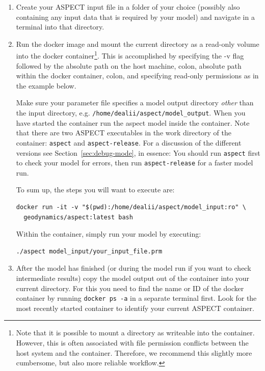 \documentclass{article}
\newcommand{\aspect}{\textsc{ASPECT}}
\begin{document}
\begin{enumerate}
\item Create your \aspect{} input file in a folder of your choice (possibly
also containing any input data that is required by your model) and navigate in a
terminal into that directory.
\item Run the docker image and mount the current directory as a read-only
volume into the docker container\footnote{Note that it is possible to mount a
directory as writeable into the container. However, this is often associated
with file permission conflicts between the host system and the container.
Therefore, we recommend this slightly more cumbersome, but also more reliable
workflow.}. This is accomplished by specifying the -v flag followed by
the absolute path on the host machine, colon, absolute path within the docker
container, colon, and specifying read-only permissions as in the example below.

Make sure your parameter file specifies a model output directory \textit{other}
than the input directory, e.g. \texttt{/home/dealii/aspect/model\_output}. When
you have started the container run the aspect model inside the container. Note
that there are two \aspect{} executables in the work directory of the container:
\texttt{aspect} and \texttt{aspect-release}. For a discussion of the
different versions see Section~\ref{sec:debug-mode}, in essence: You should run
\texttt{aspect} first to check your model for errors, then run
\texttt{aspect-release} for a faster model run.

To sum up, the steps you will want to execute are:
\begin{lstlisting}[frame=single,language=ksh,showstringspaces=false]
docker run -it -v "$(pwd):/home/dealii/aspect/model_input:ro" \
  geodynamics/aspect:latest bash
\end{lstlisting}

Within the container, simply run your model by executing:

\begin{lstlisting}[frame=single,language=ksh]
./aspect model_input/your_input_file.prm
\end{lstlisting}

\item After the model has finished (or during the model run if you want to check
intermediate results) copy the model output out of the container into your
current directory. For this you need to find the name or ID of the docker
container by running \texttt{docker ps -a} in a separate terminal first. Look
for the most recently started container to identify your current \aspect{}
container.


\end{enumerate}
\end{document}
